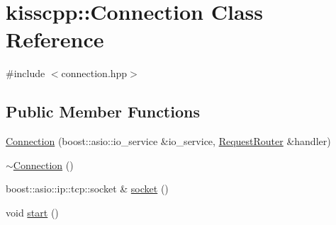 \hypertarget{classkisscpp_1_1_connection}{\section{kisscpp\-:\-:Connection Class Reference}
\label{classkisscpp_1_1_connection}
}


{\ttfamily \#include $<$connection.\-hpp$>$}

\subsection*{Public Member Functions}
\begin{DoxyCompactItemize}
\item 
\hyperlink{classkisscpp_1_1_connection_aa1cd7b458cc101092c9a83c4618e6f4e}{Connection} (boost\-::asio\-::io\-\_\-service \&io\-\_\-service, \hyperlink{classkisscpp_1_1_request_router}{Request\-Router} \&handler)
\item 
\hyperlink{classkisscpp_1_1_connection_acdc21c339ec95978cf74f38c395430dd}{$\sim$\-Connection} ()
\item 
boost\-::asio\-::ip\-::tcp\-::socket \& \hyperlink{classkisscpp_1_1_connection_af8fa26370281f97e44bc05a669c7f040}{socket} ()
\item 
void \hyperlink{classkisscpp_1_1_connection_aaad88f72fad4844f03e5dd55320caeae}{start} ()
\end{DoxyCompactItemize}


